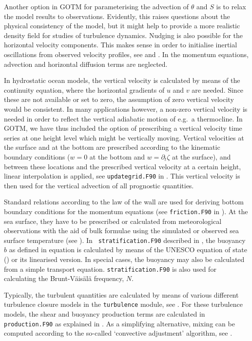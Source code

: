 Another option in GOTM for parameterising the advection of $\theta$
and $S$ is to relax the model results to observations. Evidently, this
raises questions about the physical consistency of the model, but it
might help to provide a more realistic density field for studies of
turbulence dynamics.  Nudging is also possible for the horizontal
velocity components.  This makes sense in order to initialise inertial
oscillations from observed velocity profiles, see 
and .  In the momentum equations, advection and
horizontal diffusion terms are neglected.

In hydrostatic ocean models, the vertical velocity is calculated by
means of the continuity equation, where the horizontal gradients of
$u$ and $v$ are needed. Since these are not available or set to zero,
the assumption of zero vertical velocity would be consistent.  In many
applications however, a non-zero vertical velocity is needed in order
to reflect the vertical adiabatic motion of e.g.\ a thermocline.  In
GOTM, we have thus included the option of prescribing a vertical
velocity time series at one height level which might be vertically
moving.  Vertical velocities at the surface and at the bottom are
prescribed according to the kinematic boundary conditions ($w=0$ at
the bottom and $w=\partial_t\zeta$ at the surface), and between these
locations and the prescribed vertical velocity at a certain height,
linear interpolation is applied, see {\tt updategrid.F90} in
.  This vertical velocity is then used for the
vertical advection of all prognostic quantities.

Standard relations according to the law of the wall are used for
deriving bottom boundary conditions for the momentum equations (see
{\tt friction.F90} in ). At the sea surface, they
have to be prescribed or calculated from meteorological observations
with the aid of bulk formulae using the simulated or observed sea
surface temperature (see ). In {\tt
stratification.F90} described in , the
buoyancy $b$ as defined in equation  is calculated by
means of the UNESCO equation of state (\cite{FofonoffMillard83})
or its linearised version. In
special cases, the buoyancy may also be calculated from a simple
transport equation. {\tt stratification.F90} is also used for
calculating the Brunt-V\"ais\"al\"a frequency, $N$.

Typically, the turbulent quantities are calculated by means of various
different turbulence closure models in the {\tt turbulence} module,
see .  For these turbulence models, the shear and
buoyancy production terms are calculated in {\tt production.F90} as
explained in . As a simplifying alternative,
mixing can be computed according to the so-called `convective
adjustment' algorithm, see .

